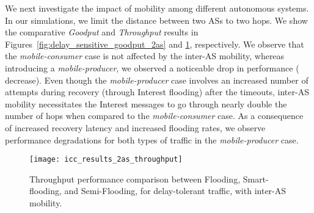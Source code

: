 \documentclass[conference]{IEEEtran}
\begin{document}
We next investigate the impact of mobility among different autonomous systems. In our simulations, we limit the distance between two ASs to two hops. We show the comparative \emph{Goodput} and \emph{Throughput} results in Figures~\ref{fig:delay_sensitive_goodput_2as} and \ref{ThroughputResults2AS}, respectively. We observe that the \emph{mobile-consumer} case is not affected by the inter-AS mobility, whereas introducing a \emph{mobile-producer}, we observed a noticeable drop in performance ( decrease). Even though the \emph{mobile-producer} case involves an increased number of attempts during recovery (through Interest flooding) after the timeouts, inter-AS mobility necessitates the Interest messages to go through nearly double the number of hops when compared to the \emph{mobile-consumer} case. As a consequence of increased recovery latency and increased flooding rates, we observe performance degradations for both types of traffic in the \emph{mobile-producer} case.

\begin{figure}[htb]
  \centering
\texttt{[image: icc\_results\_2as\_throughput]}\\
  \caption{Throughput performance comparison between Flooding, Smart-flooding, and Semi-Flooding, for delay-tolerant traffic, with inter-AS mobility.}\label{ThroughputResults2AS}
\end{figure}
\end{document}
